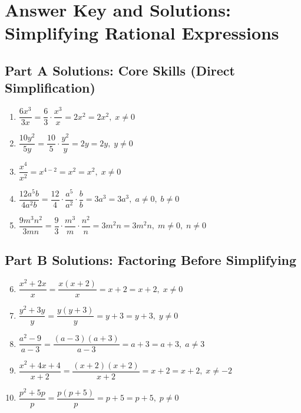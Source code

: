 \documentclass[14pt]{extarticle}
\begin{document}
\newpage


\section*{Answer Key and Solutions: Simplifying Rational Expressions}

\subsection*{Part A Solutions: Core Skills (Direct Simplification)}
\begin{enumerate}
  \item \(\dfrac{6x^3}{3x}
  = \dfrac{6}{3} \cdot \dfrac{x^3}{x}
  = 2x^{2}
  = \boxed{2x^2}, \; x \ne 0\)

  \item \(\dfrac{10y^2}{5y}
  = \dfrac{10}{5} \cdot \dfrac{y^2}{y}
  = 2y
  = \boxed{2y}, \; y \ne 0\)

  \item \(\dfrac{x^4}{x^2}
  = x^{4-2}
  = x^2
  = \boxed{x^2}, \; x \ne 0\)

  \item \(\dfrac{12a^5 b}{4a^2 b}
  = \dfrac{12}{4} \cdot \dfrac{a^5}{a^2} \cdot \dfrac{b}{b}
  = 3a^{3}
  = \boxed{3a^3}, \; a \ne 0,\; b \ne 0\)

  \item \(\dfrac{9m^3 n^2}{3mn}
  = \dfrac{9}{3} \cdot \dfrac{m^3}{m} \cdot \dfrac{n^2}{n}
  = 3m^{2} n
  = \boxed{3m^2 n}, \; m \ne 0,\; n \ne 0\)
\end{enumerate}

\subsection*{Part B Solutions: Factoring Before Simplifying}
\begin{enumerate}
  \setcounter{enumi}{5}
  \item \(\dfrac{x^2 + 2x}{x}
  = \dfrac{x(x+2)}{x}
  = x+2
  = \boxed{x+2}, \; x \ne 0\)

  \item \(\dfrac{y^2 + 3y}{y}
  = \dfrac{y(y+3)}{y}
  = y+3
  = \boxed{y+3}, \; y \ne 0\)

  \item \(\dfrac{a^2 - 9}{a - 3}
  = \dfrac{(a-3)(a+3)}{a-3}
  = a+3
  = \boxed{a+3}, \; a \ne 3\)

  \item \(\dfrac{x^2 + 4x + 4}{x + 2}
  = \dfrac{(x+2)(x+2)}{x+2}
  = x+2
  = \boxed{x+2}, \; x \ne -2\)

  \item \(\dfrac{p^2 + 5p}{p}
  = \dfrac{p(p+5)}{p}
  = p+5
  = \boxed{p+5}, \; p \ne 0\)
\end{enumerate}
\end{document}
